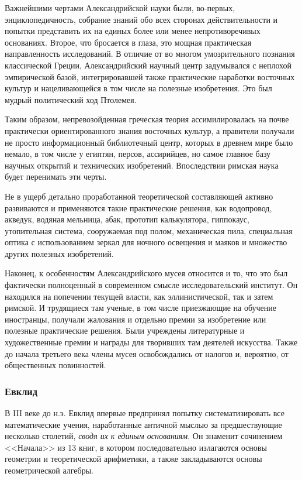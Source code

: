 Важнейшими чертами Александрийской науки были, во-первых, энциклопедичность, собрание знаний обо всех сторонах действительности и попытки представить их на единых более или менее непротиворечивых основаниях. 
Второе, что бросается в глаза, это мощная практическая направленность исследований. В отличие от во многом умозрительного познания классической Греции, Александрийский научный центр задумывался с неплохой эмпирической базой, интегрировавшей также практические наработки восточных культур и нацеливающейся в том числе на полезные изобретения. Это был мудрый политический ход Птолемея. 

Таким образом, непревозойденная греческая теория ассимилировалась на почве практически ориентированного знания восточных культур, а правители получали не просто информационный библиотечный центр, которых в древнем мире было немало, в том числе у египтян, персов, ассирийцев, но самое главное базу научных открытий и технических изобретений. Впоследствии римская наука будет перенимать эти черты. 

Не в ущерб детально проработанной теоретической составляющей активно развиваются и применяются такие практические решения, как водопровод, акведук, водяная мельница, абак, прототип калькулятора, гиппокаус, утопительная система, сооружаемая под полом, механическая пила, специальная оптика с использованием зеркал для ночного освещения и маяков и множество других полезных изобретений.

Наконец, к особенностям Александрийского мусея относится и то, что это был фактически полноценный в современном смысле исследовательский институт. Он находился на попечении текущей власти, как эллинистической, так и затем римской. И трудящиеся там ученые, в том числе приезжающие на обучение иностранцы, получали жалования и отдельно премии за изобретение или полезные практические решения. Были учреждены литературные и художественные премии и награды для творивших там деятелей искусства. Также до начала третьего века члены мусея освобождались от налогов и, вероятно, от общественных повинностей. 

\subsubsection{Евклид}
В III веке до н.э. Евклид впервые предпринял попытку систематизировать все математические учения, наработанные античной мыслью за предшествующие несколько столетий, \textit{сводя их к единым основаниям}.
Он знаменит сочинением <<Начала>> из 13 книг, в котором последовательно излагаются основы геометрии и теоретической арифметики, а также закладываются основы геометрической алгебры. 

